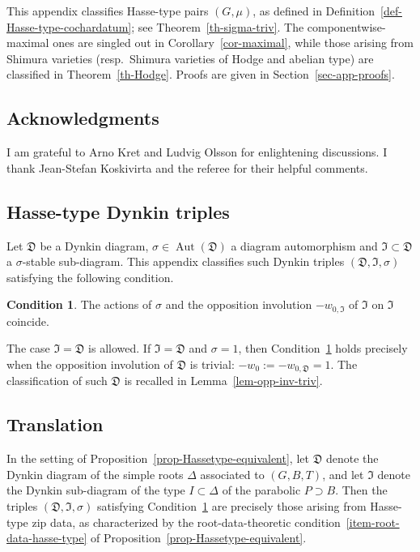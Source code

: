 \documentclass[11pt]{amsart}
\numberwithin{equation}{section}
\theoremstyle{definition}
\newtheorem{condition}[theorem]{Condition}
\theoremstyle{remark}
\newcommand{\Dfr}{{\mathfrak D}}
\newcommand{\Ifr}{{\mathfrak I}}
\DeclareMathOperator{\Aut}{Aut}
\begin{document}



    This appendix  classifies Hasse-type pairs $(G,\mu)$, as defined in Definition~\ref{def-Hasse-type-cochardatum}; see Theorem~\ref{th-sigma-triv}. The componentwise-maximal ones are singled out in Corollary~\ref{cor-maximal}, while those arising from Shimura varieties (resp.\ Shimura varieties of Hodge and abelian type) are classified in Theorem~\ref{th-Hodge}. Proofs are given in Section~\ref{sec-app-proofs}.

\subsection*{Acknowledgments}
I am grateful to Arno Kret and Ludvig Olsson for enlightening discussions. I thank Jean-Stefan Koskivirta and the referee for their helpful comments. 


\subsection{Hasse-type Dynkin triples}
Let $\Dfr$ be a Dynkin diagram, $\sigma \in \Aut(\Dfr)$ a diagram automorphism and $\Ifr \subset \Dfr$ a $\sigma$-stable sub-diagram. 
This appendix classifies such  Dynkin triples $(\Dfr, \Ifr, \sigma)$ satisfying the following condition.

\begin{condition}
\label{cond-hasse-type-root-data}
 The actions of $\sigma$ and the opposition involution $-w_{0,\Ifr}$ of $\Ifr$ on $\Ifr$ coincide.
\end{condition}

The case $\Ifr=\Dfr$ is allowed. If $\Ifr=\Dfr$ and $\sigma=1$, then Condition~\ref{cond-hasse-type-root-data} holds precisely when the opposition involution of $\Dfr$ is trivial: $-w_0:=-w_{0,\Dfr}=1$. The classification of such $\Dfr$ is recalled in Lemma~\ref{lem-opp-inv-triv}.

\subsection{Translation}
\label{sec-translation} In the setting of Proposition~\ref{prop-Hassetype-equivalent}, let $\Dfr$ denote the Dynkin diagram of the simple roots $\Delta$ associated to $(G,B,T)$, and let $\Ifr$ denote the Dynkin sub-diagram of the type $I \subset \Delta$ of the parabolic $P \supset B$. Then the triples $(\Dfr, \Ifr, \sigma)$ satisfying Condition~\ref{cond-hasse-type-root-data} are precisely those arising from Hasse-type zip data, as characterized by the root-data-theoretic condition~\eqref{item-root-data-hasse-type} of Proposition~\ref{prop-Hassetype-equivalent}.
\end{document}
